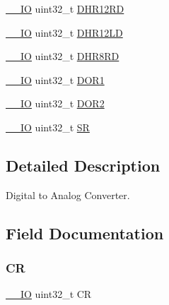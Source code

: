 \begin{DoxyCompactItemize}
\item 
\mbox{\hyperlink{core__sc300_8h_aec43007d9998a0a0e01faede4133d6be}{\+\_\+\+\_\+\+IO}} uint32\+\_\+t \mbox{\hyperlink{struct_d_a_c___type_def_a1590b77e57f17e75193da259da72095e}{D\+H\+R12\+RD}}
\item 
\mbox{\hyperlink{core__sc300_8h_aec43007d9998a0a0e01faede4133d6be}{\+\_\+\+\_\+\+IO}} uint32\+\_\+t \mbox{\hyperlink{struct_d_a_c___type_def_acc269320aff0a6482730224a4b641a59}{D\+H\+R12\+LD}}
\item 
\mbox{\hyperlink{core__sc300_8h_aec43007d9998a0a0e01faede4133d6be}{\+\_\+\+\_\+\+IO}} uint32\+\_\+t \mbox{\hyperlink{struct_d_a_c___type_def_a9590269cba8412f1be96b0ddb846ef44}{D\+H\+R8\+RD}}
\item 
\mbox{\hyperlink{core__sc300_8h_aec43007d9998a0a0e01faede4133d6be}{\+\_\+\+\_\+\+IO}} uint32\+\_\+t \mbox{\hyperlink{struct_d_a_c___type_def_aa710505be03a41981c35bacc7ce20746}{D\+O\+R1}}
\item 
\mbox{\hyperlink{core__sc300_8h_aec43007d9998a0a0e01faede4133d6be}{\+\_\+\+\_\+\+IO}} uint32\+\_\+t \mbox{\hyperlink{struct_d_a_c___type_def_aba9fb810b0cf6cbc1280c5c63be2418b}{D\+O\+R2}}
\item 
\mbox{\hyperlink{core__sc300_8h_aec43007d9998a0a0e01faede4133d6be}{\+\_\+\+\_\+\+IO}} uint32\+\_\+t \mbox{\hyperlink{struct_d_a_c___type_def_af6aca2bbd40c0fb6df7c3aebe224a360}{SR}}
\end{DoxyCompactItemize}


\subsection{Detailed Description}
Digital to Analog Converter. 

\subsection{Field Documentation}
\mbox{\label{struct_d_a_c___type_def_ab40c89c59391aaa9d9a8ec011dd0907a}} 
\subsubsection{\texorpdfstring{CR}{CR}}
{\footnotesize\ttfamily \mbox{\hyperlink{core__sc300_8h_aec43007d9998a0a0e01faede4133d6be}{\+\_\+\+\_\+\+IO}} uint32\+\_\+t CR}

